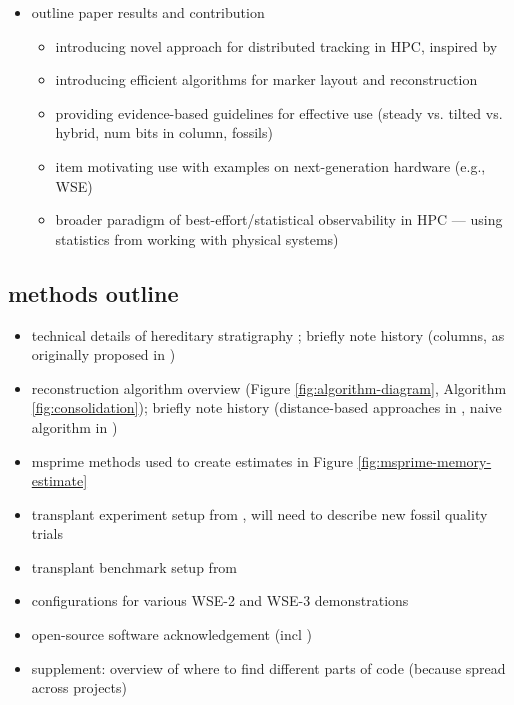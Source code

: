 \begin{itemize}
\item outline paper results and contribution
   \begin{itemize}
   \item introducing novel approach for distributed tracking in HPC, inspired by
   \item introducing efficient algorithms for marker layout and reconstruction
   \item providing evidence-based guidelines for effective use (steady vs. tilted vs. hybrid, num bits in column, fossils)
   \item item motivating use with examples on next-generation hardware (e.g., WSE)
   \item broader paradigm of best-effort/statistical observability in HPC --- using statistics from working with physical systems)
   \end{itemize}
\end{itemize}

\subsection{methods outline}

\begin{itemize}
\item technical details of hereditary stratigraphy \citep{moreno2024algorithms}; briefly note history (columns, as originally proposed in \citep{moreno2022hereditary})
\item reconstruction algorithm overview (Figure \ref{fig:algorithm-diagram}, Algorithm \ref{fig:consolidation}); briefly note history (distance-based approaches in \citep{moreno2022hereditary}, naive algorithm in \citep{moreno2023toward})
\item msprime methods used to create estimates in Figure \ref{fig:msprime-memory-estimate}
\item transplant experiment setup from \citep{moreno2025testing}, will need to describe new fossil quality trials
\item transplant benchmark setup from \citep{singhvi2025scalable}
\item configurations for various WSE-2 and WSE-3 demonstrations
\item open-source software acknowledgement (incl \citep{zanini2025unified})
\item supplement: overview of where to find different parts of code (because spread across projects)
\end{itemize}

